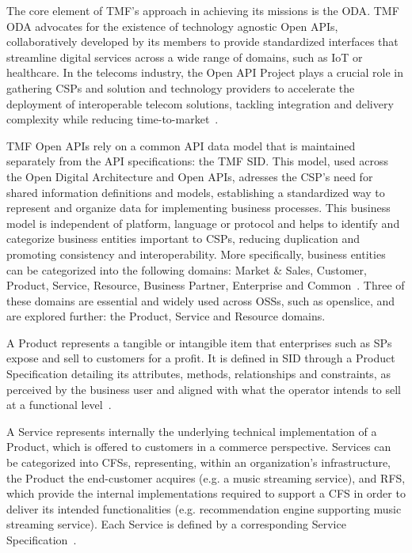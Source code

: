 The core element of \ac{TMF}'s approach in achieving its missions is the \ac{ODA}. \ac{TMF} \ac{ODA} advocates for the existence of technology agnostic Open \acp{API}, collaboratively developed by its members to provide standardized interfaces that streamline digital services across a wide range of domains, such as \ac{IoT} or healthcare. In the telecoms industry, the Open \ac{API} Project plays a crucial role in gathering \acp{CSP} and solution and technology providers to accelerate the deployment of interoperable telecom solutions, tackling integration and delivery complexity while reducing time-to-market~\cite{openAPIsTMF}.

\ac{TMF} Open \acp{API} rely on a common \acs{API} data model that is maintained separately from the \acs{API} specifications: the \ac{TMF} \ac{SID}. This model, used across the Open Digital Architecture and Open \acsp{API}, adresses the \ac{CSP}'s need for shared information definitions and models, establishing a standardized way to represent and organize data for implementing business processes. This business model is independent of platform, language or protocol and helps to identify and categorize business entities important to \acp{CSP}, reducing duplication and promoting consistency and interoperability. More specifically, business entities can be categorized into the following domains: Market \& Sales, Customer, Product, Service, Resource, Business Partner, Enterprise and Common~\cite{SIDTMF}. Three of these domains are essential and widely used across \acfp{OSS}, such as openslice, and are explored further: the Product, Service and Resource domains.



A Product represents a tangible or intangible item that enterprises such as \acp{SP} expose and sell to customers for a profit. It is defined in \ac{SID} through a Product Specification detailing its attributes, methods, relationships and constraints, as perceived by the business user and aligned with what the operator intends to sell at a functional level~\cite{SID-MODELS-v250-TMF}.


A Service represents internally the underlying technical implementation of a Product, which is offered to customers in a commerce perspective. Services can be categorized into \acfp{CFS}, representing, within an organization's infrastructure, the Product the end-customer acquires (e.g. a music streaming service), and \ac{RFS}, which provide the internal implementations required to support a \ac{CFS} in order to deliver its intended functionalities (e.g. recommendation engine supporting music streaming service). Each Service is defined by a corresponding Service Specification~\cite{SID-MODELS-v250-TMF}.

